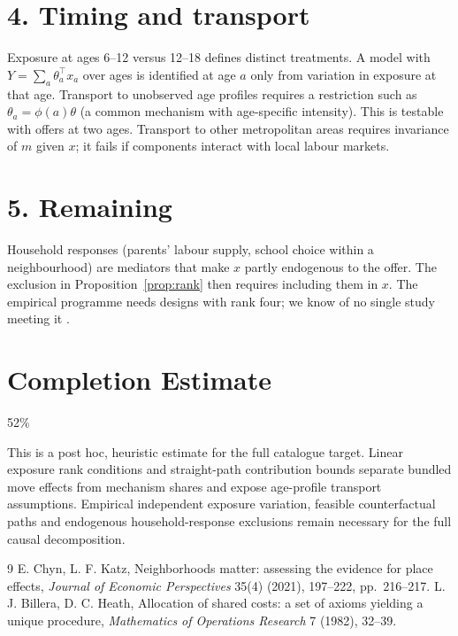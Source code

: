 \documentclass[11pt]{article}
\theoremstyle{definition}
\begin{document}
\section*{4. Timing and transport}
Exposure at ages 6--12 versus 12--18 defines distinct treatments. A model with $Y=\sum_a\theta_a^\top x_a$ over ages is
identified at age $a$ only from variation in exposure at that age. Transport to unobserved age profiles requires a
restriction such as $\theta_a=\phi(a)\theta$ (a common mechanism with age-specific intensity). This is testable with
offers at two ages. Transport to other metropolitan areas requires invariance of $m$ given $x$; it fails if components
interact with local labour markets.

\section*{5. Remaining}
Household responses (parents' labour supply, school choice within a neighbourhood) are mediators that make $x$ partly
endogenous to the offer. The exclusion in Proposition~\ref{prop:rank} then requires including them in $x$. The empirical
programme needs designs with rank four; we know of no single study meeting it \cite{ck}.

\section{Completion Estimate}
52\%

This is a post hoc, heuristic estimate for the full catalogue target.
Linear exposure rank conditions and straight-path contribution bounds separate bundled move effects from mechanism shares and expose age-profile transport assumptions. Empirical independent exposure variation, feasible counterfactual paths and endogenous household-response exclusions remain necessary for the full causal decomposition.

\begin{thebibliography}{9}
 E. Chyn, L. F. Katz, Neighborhoods matter: assessing the evidence for place effects, \emph{Journal of Economic Perspectives} 35(4) (2021), 197--222, pp.~216--217.
 L. J. Billera, D. C. Heath, Allocation of shared costs: a set of axioms yielding a unique procedure, \emph{Mathematics of Operations Research} 7 (1982), 32--39.
\end{thebibliography}
\end{document}
